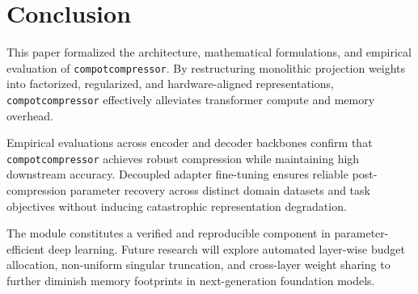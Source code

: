 \section{Conclusion}
This paper formalized the architecture, mathematical formulations, and empirical evaluation of \texttt{compotcompressor}. By restructuring monolithic projection weights into factorized, regularized, and hardware-aligned representations, \texttt{compotcompressor} effectively alleviates transformer compute and memory overhead.

Empirical evaluations across encoder and decoder backbones confirm that \texttt{compotcompressor} achieves robust compression while maintaining high downstream accuracy. Decoupled adapter fine-tuning ensures reliable post-compression parameter recovery across distinct domain datasets and task objectives without inducing catastrophic representation degradation.

The module constitutes a verified and reproducible component in parameter-efficient deep learning. Future research will explore automated layer-wise budget allocation, non-uniform singular truncation, and cross-layer weight sharing to further diminish memory footprints in next-generation foundation models.
